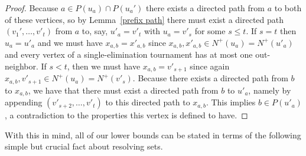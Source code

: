 \documentclass[12pt,letterpaper]{article}
\theoremstyle{definition}
\renewcommand{\1}{\mathbbm{1}}
\begin{document}
\begin{proof}
	Because $a\in P(u_a)\cap P(u_a')$ there exists a directed path from $a$ to both of these vertices, so by Lemma~\ref{prefix path} there must exist a directed path $(v_1',\ldots,v'_t)$ from $a$ to, say, $u'_a=v'_t$ with $u_a=v'_s$ for some $s\le t$.  If $s=t$ then $u_a=u'_a$ and we must have $x_{a,b}=x'_{a,b}$ since $x_{a,b},x'_{a,b}\in N^+(u_a)=N^+(u'_a)$ and every vertex of a single-elimination tournament has at most one out-neighbor.  If $s<t$, then we must have $x_{a,b}=v'_{s+1}$ since again $x_{a,b},v'_{s+1}\in N^+(u_a)=N^+(v'_s)$.  Because there exists a directed path from $b$ to $x_{a,b}$, we have that there must exist a directed path from $b$ to $u'_a$, namely by appending $(v'_{s+2},\ldots,v'_t)$ to this directed path to $x_{a,b}$.  This implies $b\in P(u'_a)$, a contradiction to the properties this vertex is defined to have.\fi 
\end{proof}

With this in mind, all of our lower bounds can be stated in terms of the following simple but crucial fact about resolving sets.
\end{document}
